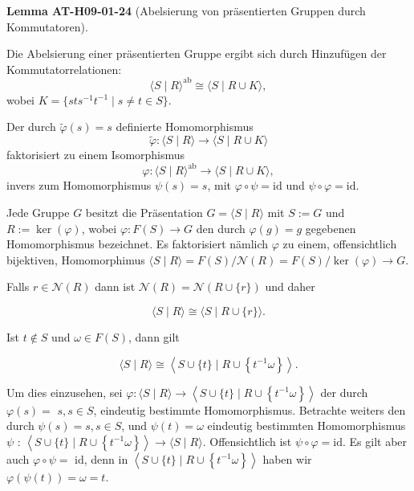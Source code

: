\documentclass[10pt, letterpaper]{article}
\newcommand{\CustomHeading}[3]{%
  \par\medskip\noindent%
  \textbf{#1 #2} \textnormal{(#3)}.\enskip%
}
\newenvironment{LEM}[2]{\begin{unitbox}\CustomHeading{Lemma}{#1}{#2}}{\end{unitbox}}
\begin{document}
\begin{LEM}{AT-H09-01-24}{Abelsierung von präsentierten Gruppen durch Kommutatoren}
Die Abelsierung einer präsentierten Gruppe ergibt sich durch Hinzufügen der Kommutatorrelationen:
\[
\langle S \mid R\rangle^{\mathrm{ab}} \cong \langle S \mid R \cup K\rangle,
\]
wobei $K = \{ sts^{-1}t^{-1} \mid s \neq t \in S \}$.

Der durch $\tilde{\varphi}(s) = s$ definierte Homomorphismus
\[
\tilde{\varphi}: \langle S \mid R\rangle \to \langle S \mid R \cup K\rangle
\]
faktorisiert zu einem Isomorphismus
\[
\varphi: \langle S \mid R\rangle^{\mathrm{ab}} \to \langle S \mid R \cup K\rangle,
\]
invers zum Homomorphismus $\psi(s) = s$, mit $\varphi \circ \psi = \mathrm{id}$ und $\psi \circ \varphi = \mathrm{id}$.
\end{LEM}






Jede Gruppe $G$ besitzt die Präsentation $G=\langle S \mid R\rangle$ mit $S:=G$ und $R:=\operatorname{ker}(\varphi)$, wobei $\varphi: F(S) \rightarrow G$ den durch $\varphi(g)=g$ gegebenen Homomorphismus bezeichnet. Es faktorisiert nämlich $\varphi$ zu einem, offensichtlich bijektiven, Homomorphimus $\langle S \mid R\rangle=F(S) / \mathcal{N}(R)=F(S) / \operatorname{ker}(\varphi) \rightarrow G$.

Falls $r \in \mathcal{N}(R)$ dann ist $\mathcal{N}(R)=\mathcal{N}(R \cup\{r\})$ und daher

$$
\langle S \mid R\rangle \cong\langle S \mid R \cup\{r\}\rangle .
$$


Ist $t \notin S$ und $\omega \in F(S)$, dann gilt

$$
\langle S \mid R\rangle \cong\left\langle S \cup\{t\} \mid R \cup\left\{t^{-1} \omega\right\}\right\rangle .
$$


Um dies einzusehen, sei $\varphi:\langle S \mid R\rangle \rightarrow\left\langle S \cup\{t\} \mid R \cup\left\{t^{-1} \omega\right\}\right\rangle$ der durch $\varphi(s)=$ $s, s \in S$, eindeutig bestimmte Homomorphismus. Betrachte weiters den durch $\psi(s)=s, s \in S$, und $\psi(t)=\omega$ eindeutig bestimmten Homomorphismus $\psi$ : $\left\langle S \cup\{t\} \mid R \cup\left\{t^{-1} \omega\right\}\right\rangle \rightarrow\langle S \mid R\rangle$. Offensichtlich ist $\psi \circ \varphi=\mathrm{id}$. Es gilt aber auch $\varphi \circ \psi=$ id, denn in $\left\langle S \cup\{t\} \mid R \cup\left\{t^{-1} \omega\right\}\right\rangle$ haben wir $\varphi(\psi(t))=\omega=t$.
\end{document}

